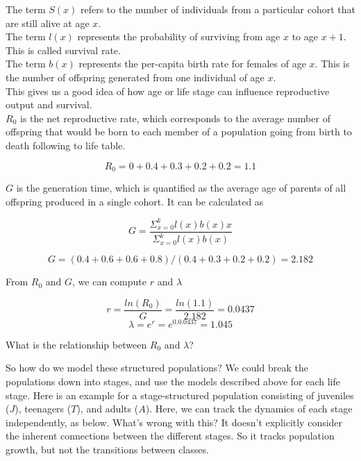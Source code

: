 \documentclass[12pt]{article}
\begin{document}
The term $S(x)$ refers to the number of individuals from a particular cohort that are still alive at age $x$. \\


The term $l(x)$ represents the probability of surviving from age $x$ to age $x+1$. This is called survival rate.\\


The term $b(x)$ represents the per-capita birth rate for females of age $x$. This is the number of offspring generated from one individual of age $x$.\\


This gives us a good idea of how age or life stage can influence reproductive output and survival. \\


$R_0$ is the net reproductive rate, which corresponds to the average number of offspring that would be born to each member of a population going from birth to death following to life table. 

\[ R_{0} = 0 + 0.4 + 0.3 + 0.2 + 0.2 = 1.1 \] 

$G$ is the generation time, which is quantified as the average age of parents of all offspring produced in a single cohort. It can be calculated as 


\[ G = \frac{\Sigma_{x=0}^{k} l(x)b(x)x}{\Sigma_{x=0}^{k} l(x)b(x)}  \]

\[ G = (0.4+0.6+0.6+0.8) / (0.4+0.3+0.2+0.2)  =  2.182 \]

From $R_0$ and $G$, we can compute $r$ and $\lambda$


\[ r = \frac{ln(R_0)}{G} = \frac{ln(1.1)}{2.182} = 0.0437 \]
\[ \lambda = e^{r} = e^{0.0.0437} = 1.045 \]



What is the relationship between $R_{0}$ and $\lambda$?











\clearpage





So how do we model these structured populations? We could break the populations down into stages, and use the models described above for each life stage. Here is an example for a stage-structured population consisting of juveniles ($J$), teenagers ($T$), and adults ($A$). Here, we can track the dynamics of each stage independently, as below. What's wrong with this? It doesn't explicitly consider the inherent connections between the different stages. So it tracks population growth, but not the transitions between classes. \\
\end{document}
